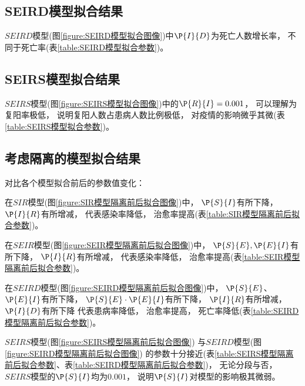 \subsection{SEIRD模型拟合结果}
\par $SEIRD$模型(图\ref{figure:SEIRD模型拟合图像})中$\P{I}{D}$为死亡人数增长率，
不同于死亡率(表\ref{table:SEIRD模型拟合参数})。
\subsection{SEIRS模型拟合结果}
\par $SEIRS$模型(图\ref{figure:SEIRS模型拟合图像})中的$\P{R}{I}=0.001$，
可以理解为复阳率极低，
说明复阳人数占患病人数比例极低，
对疫情的影响微乎其微(表\ref{table:SEIRS模型拟合参数})。
\subsection{考虑隔离的模型拟合结果}
\par 对比各个模型拟合前后的参数值变化：
\par 在$SIR$模型(图\ref{figure:SIR模型隔离前后拟合图像})中，
$\P{S}{I}$有所下降，
$\P{I}{R}$有所增减，
代表感染率降低，
治愈率提高(表\ref{table:SIR模型隔离前后拟合参数})。
\par 在$SEIR$模型(图\ref{figure:SEIR模型隔离前后拟合图像})中，
$\P{S}{E},\P{E}{I}$有所下降，
$\P{I}{R}$有所增减，
代表感染率降低，
治愈率提高(表\ref{table:SEIR模型隔离前后拟合参数})。
\par 在$SEIRD$模型(图\ref{figure:SEIRD模型隔离前后拟合图像})中，
$\P{S}{E}$、
$\P{E}{I}$有所下降，
$\P{S}{E}\cdot \P{E}{I}$有所下降，
$\P{I}{R}$有所增减，
$\P{I}{D}$有所下降
代表患病率降低，
治愈率提高，
死亡率降低(表\ref{table:SEIRD模型隔离前后拟合参数})。
\par $SEIRS$模型(图\ref{figure:SEIRS模型隔离前后拟合图像})
与$SEIRD$模型(图\ref{figure:SEIRD模型隔离前后拟合图像})
的参数十分接近(表\ref{table:SEIRS模型隔离前后拟合参数}、表\ref{table:SEIRD模型隔离前后拟合参数})，
无论分段与否，$SEIRS$模型的$\P{S}{I}$均为$0.001$，
说明$\P{S}{I}$对模型的影响极其微弱。
